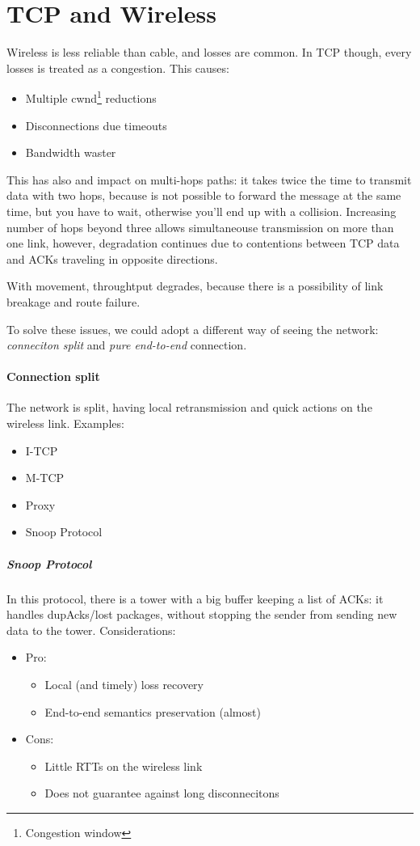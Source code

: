 \section{TCP and Wireless}

Wireless is less reliable than cable, and losses are common. In TCP though,
every losses is treated as a congestion. This causes:
\begin{itemize}
\item Multiple cwnd\footnote{Congestion window} reductions
\item Disconnections due timeouts
\item Bandwidth waster
\end{itemize}

This has also and impact on multi-hops paths: it takes twice the time to
transmit data with two hops, because is not possible to forward the message at
the same time, but you have to wait, otherwise you'll end up with a collision.
Increasing number of hops beyond three allows simultaneouse transmission on more
than one link, however, degradation continues due to contentions between TCP
data and ACKs traveling in opposite directions.

With movement, throughtput degrades, because there is a possibility of link
breakage and route failure.

To solve these issues, we could adopt a different way of seeing the network:
\textit{conneciton split} and \textit{pure end-to-end} connection.

\paragraph*{Connection split} The network is split, having local retransmission
and quick actions on the wireless link.
Examples:
\begin{itemize}
\item I-TCP
\item M-TCP
\item Proxy
\item Snoop Protocol
\end{itemize}

\subparagraph*{Snoop Protocol} In this protocol, there is a tower with a big
buffer keeping a list of ACKs: it handles dupAcks/lost packages, without
stopping the sender from sending new data to the tower.
Considerations:
\begin{itemize}
\item Pro:
  \begin{itemize}
  \item Local (and timely) loss recovery
  \item End-to-end semantics preservation (almost)
  \end{itemize}
\item Cons:
  \begin{itemize}
  \item Little RTTs on the wireless link
  \item Does not guarantee against long disconnecitons
  \end{itemize}
\end{itemize}

